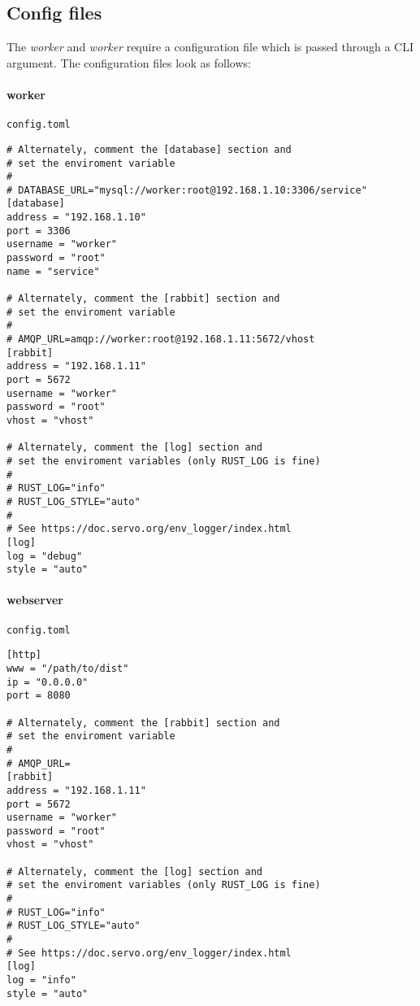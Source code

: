 \documentclass[../documentation.tex]{subfiles}
\begin{document}
\pagebreak

\subsection{Config files}

The \textit{worker} and \textit{worker} require a configuration
file which is passed through a CLI argument.
The configuration files look as follows:

\paragraph{worker} \texttt{config.toml}

\begin{lstlisting}[style=toml, numbers=none]
# Alternately, comment the [database] section and
# set the enviroment variable
#
# DATABASE_URL="mysql://worker:root@192.168.1.10:3306/service"
[database]
address = "192.168.1.10"
port = 3306
username = "worker"
password = "root"
name = "service"

# Alternately, comment the [rabbit] section and
# set the enviroment variable
#
# AMQP_URL=amqp://worker:root@192.168.1.11:5672/vhost
[rabbit]
address = "192.168.1.11"
port = 5672
username = "worker"
password = "root"
vhost = "vhost"

# Alternately, comment the [log] section and
# set the enviroment variables (only RUST_LOG is fine)
#
# RUST_LOG="info"
# RUST_LOG_STYLE="auto"
#
# See https://doc.servo.org/env_logger/index.html
[log]
log = "debug"
style = "auto"
\end{lstlisting}

\pagebreak

\paragraph{webserver} \texttt{config.toml}

\begin{lstlisting}[style=toml, numbers=none]
[http]
www = "/path/to/dist"
ip = "0.0.0.0"
port = 8080

# Alternately, comment the [rabbit] section and
# set the enviroment variable
#
# AMQP_URL=
[rabbit]
address = "192.168.1.11"
port = 5672
username = "worker"
password = "root"
vhost = "vhost"

# Alternately, comment the [log] section and
# set the enviroment variables (only RUST_LOG is fine)
#
# RUST_LOG="info"
# RUST_LOG_STYLE="auto"
#
# See https://doc.servo.org/env_logger/index.html
[log]
log = "info"
style = "auto"
\end{lstlisting}
\end{document}
